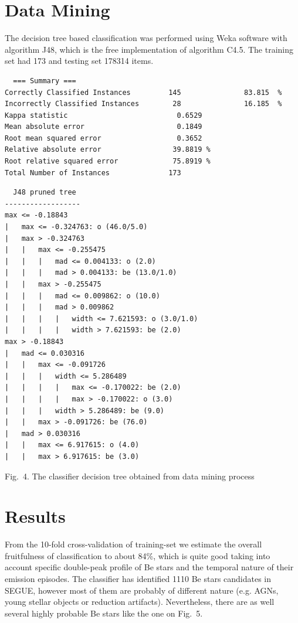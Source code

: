 \documentclass[11pt,twoside]{article}
\begin{document}
\clearpage

\section{Data Mining}
The decision tree based classification was performed using Weka software with algorithm
J48, which is the free implementation of algorithm C4.5. The training set had
173 and testing set 178314 items.



\begin{lstlisting}
  === Summary ===
Correctly Classified Instances         145               83.815  %
Incorrectly Classified Instances        28               16.185  %
Kappa statistic                          0.6529
Mean absolute error                      0.1849
Root mean squared error                  0.3652
Relative absolute error                 39.8819 %
Root relative squared error             75.8919 %
Total Number of Instances              173     
\end{lstlisting}

\begin{lstlisting}
  J48 pruned tree
------------------
max <= -0.18843
|   max <= -0.324763: o (46.0/5.0)
|   max > -0.324763
|   |   max <= -0.255475
|   |   |   mad <= 0.004133: o (2.0)
|   |   |   mad > 0.004133: be (13.0/1.0)
|   |   max > -0.255475
|   |   |   mad <= 0.009862: o (10.0)
|   |   |   mad > 0.009862
|   |   |   |   width <= 7.621593: o (3.0/1.0)
|   |   |   |   width > 7.621593: be (2.0)
max > -0.18843
|   mad <= 0.030316
|   |   max <= -0.091726
|   |   |   width <= 5.286489
|   |   |   |   max <= -0.170022: be (2.0)
|   |   |   |   max > -0.170022: o (3.0)
|   |   |   width > 5.286489: be (9.0)
|   |   max > -0.091726: be (76.0)
|   mad > 0.030316
|   |   max <= 6.917615: o (4.0)
|   |   max > 6.917615: be (3.0)
\end{lstlisting}


\parbox{0.999\textwidth}{Fig.~4. The classifier decision tree obtained from data mining process} 
%



\section{Results}

From the 10-fold cross-validation of training-set we estimate the overall
fruitfulness of classification to about 84\%, which is quite good taking into
account specific  double-peak profile  of Be stars and the temporal nature of
their emission episodes. The classifier has identified 1110 Be stars
candidates in SEGUE, however most of them are probably of different nature
(e.g. AGNs, young stellar objects or reduction artifacts). Nevertheless, there
are as well several highly probable  Be stars like the one on Fig.~5.
\end{document}

